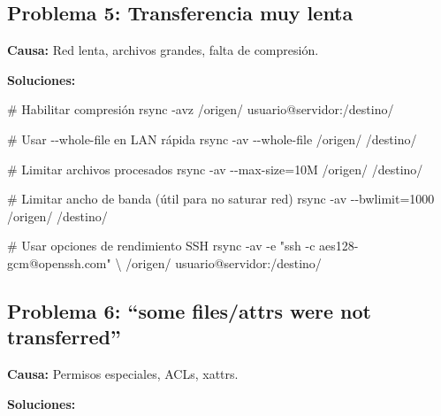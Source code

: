 \documentclass[
  doc,
  floatsintext,
  longtable,
  a4paper,
  nolmodern,
  notxfonts,
  notimes,
  12pt,
  colorlinks=true,linkcolor=blue,citecolor=blue,urlcolor=blue]{apa7}
\newenvironment{Shaded}{\begin{snugshade}}{\end{snugshade}}
\newcommand{\AttributeTok}[1]{\textcolor[rgb]{0.40,0.45,0.13}{#1}}
\newcommand{\CommentTok}[1]{\textcolor[rgb]{0.37,0.37,0.37}{#1}}
\newcommand{\DataTypeTok}[1]{\textcolor[rgb]{0.68,0.00,0.00}{#1}}
\newcommand{\FunctionTok}[1]{\textcolor[rgb]{0.28,0.35,0.67}{#1}}
\newcommand{\NormalTok}[1]{\textcolor[rgb]{0.00,0.23,0.31}{#1}}
\newcommand{\OperatorTok}[1]{\textcolor[rgb]{0.37,0.37,0.37}{#1}}
\newcommand{\StringTok}[1]{\textcolor[rgb]{0.13,0.47,0.30}{#1}}
\begin{document}
\subsection{Problema 5: Transferencia muy
lenta}\label{problema-5-transferencia-muy-lenta}

\textbf{Causa:} Red lenta, archivos grandes, falta de compresión.

\textbf{Soluciones:}

\begin{Shaded}
\begin{Highlighting}[]
\CommentTok{\# Habilitar compresión}
\FunctionTok{rsync} \AttributeTok{{-}avz}\NormalTok{ /origen/ usuario@servidor:/destino/}

\CommentTok{\# Usar {-}{-}whole{-}file en LAN rápida}
\FunctionTok{rsync} \AttributeTok{{-}av} \AttributeTok{{-}{-}whole{-}file}\NormalTok{ /origen/ /destino/}

\CommentTok{\# Limitar archivos procesados}
\FunctionTok{rsync} \AttributeTok{{-}av} \AttributeTok{{-}{-}max{-}size}\OperatorTok{=}\NormalTok{10M /origen/ /destino/}

\CommentTok{\# Limitar ancho de banda (útil para no saturar red)}
\FunctionTok{rsync} \AttributeTok{{-}av} \AttributeTok{{-}{-}bwlimit}\OperatorTok{=}\NormalTok{1000 /origen/ /destino/}

\CommentTok{\# Usar opciones de rendimiento SSH}
\FunctionTok{rsync} \AttributeTok{{-}av} \AttributeTok{{-}e} \StringTok{"ssh {-}c aes128{-}gcm@openssh.com"} \DataTypeTok{\textbackslash{}}
\NormalTok{    /origen/ usuario@servidor:/destino/}
\end{Highlighting}
\end{Shaded}

\subsection{Problema 6: ``some files/attrs were not
transferred''}\label{problema-6-some-filesattrs-were-not-transferred}

\textbf{Causa:} Permisos especiales, ACLs, xattrs.

\textbf{Soluciones:}
\end{document}
